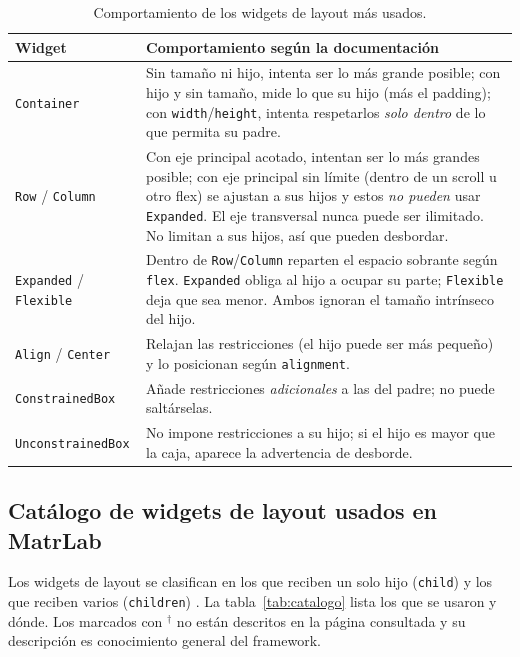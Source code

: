 \begin{table}[H]
	\centering\footnotesize
	\begin{tabularx}{\textwidth}{|p{3.0cm}|X|}
		\hline
		\rowcolor{tablebackground}\color{white}\textbf{Widget} & \color{white}\textbf{Comportamiento según la documentación \cite{flutterconstr}}\\
		\hline
		\texttt{Container} & Sin tamaño ni hijo, intenta ser lo más grande posible; con hijo y sin tamaño, mide lo que su hijo (más el padding); con \texttt{width}/\texttt{height}, intenta respetarlos \emph{solo dentro} de lo que permita su padre. \\\hline
		\texttt{Row} / \texttt{Column} & Con eje principal acotado, intentan ser lo más grandes posible; con eje principal sin límite (dentro de un scroll u otro flex) se ajustan a sus hijos y estos \emph{no pueden} usar \texttt{Expanded}. El eje transversal nunca puede ser ilimitado. No limitan a sus hijos, así que pueden desbordar. \\\hline
		\texttt{Expanded} / \texttt{Flexible} & Dentro de \texttt{Row}/\texttt{Column} reparten el espacio sobrante según \texttt{flex}. \texttt{Expanded} obliga al hijo a ocupar su parte; \texttt{Flexible} deja que sea menor. Ambos ignoran el tamaño intrínseco del hijo. \\\hline
		\texttt{Align} / \texttt{Center} & Relajan las restricciones (el hijo puede ser más pequeño) y lo posicionan según \texttt{alignment}. \\\hline
		\texttt{ConstrainedBox} & Añade restricciones \emph{adicionales} a las del padre; no puede saltárselas. \\\hline
		\texttt{UnconstrainedBox} & No impone restricciones a su hijo; si el hijo es mayor que la caja, aparece la advertencia de desborde. \\\hline
	\end{tabularx}
	\caption{Comportamiento de los widgets de layout más usados.}
	\label{tab:comportamiento}
\end{table}

\subsection{Catálogo de widgets de layout usados en MatrLab}
\label{sec:catalogo}
Los widgets de layout se clasifican en los que reciben un solo hijo (\texttt{child}) y los que reciben varios (\texttt{children}) \cite{flutterlayout}. La tabla~\ref{tab:catalogo} lista los que se usaron y dónde. Los marcados con $^\dagger$ no están descritos en la página consultada y su descripción es conocimiento general del framework.

